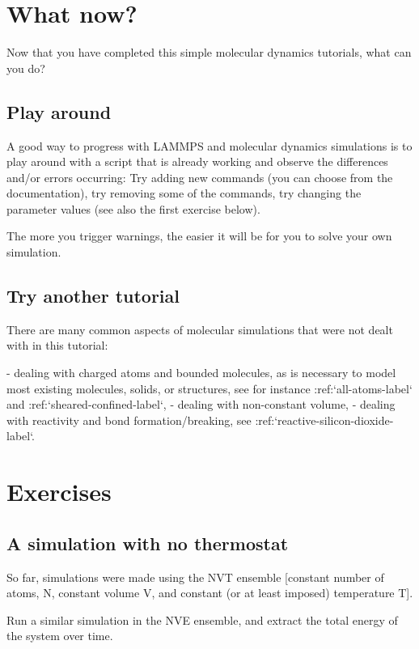 \section{What now?}

Now that you have completed this simple molecular dynamics tutorials, what can you do?

\subsection{Play around}

A good way to progress with LAMMPS and molecular dynamics
simulations is to play around with a script that is already
working and observe the differences and/or errors occurring:
Try adding new commands (you can choose from the documentation),
try removing some of the commands, try changing the parameter values
(see also the first exercise below).

The more you trigger warnings, the easier it will be for you to solve your
own simulation.

\subsection{Try another tutorial}

There are many common aspects of molecular simulations that were not dealt with in this
tutorial:

- dealing with charged atoms and bounded molecules, as is necessary to model most existing molecules, solids, or structures, see for instance :ref:`all-atoms-label` and :ref:`sheared-confined-label`,
- dealing with non-constant volume,
- dealing with reactivity and bond formation/breaking, see :ref:`reactive-silicon-dioxide-label`.

\section{Exercises}

\subsection{A simulation with no thermostat}

So far, simulations were made using the NVT ensemble [constant number 
of atoms, N, constant volume V, and constant (or at least imposed)
temperature T].

Run a similar simulation in the NVE ensemble, and extract the
total energy of the system over time.

